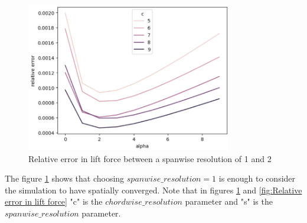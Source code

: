 \begin{figure}[H]
    \centering
    \includegraphics[width=0.8\textwidth]{figures/Optimization/3D/error_span_1_2.png}
    \caption{Relative error in lift force between a spanwise resolution of 1 and 2}
    \label{fig:Relative error in lift force between a spanwise resolution of 1 and 2}
\end{figure}

The figure \ref{fig:Relative error in lift force between a spanwise resolution of 1 and 2} shows that choosing $spanwise\_resolution = 1$ is enough to consider the simulation to have spatially converged. Note that in figures  \ref{fig:Relative error in lift force between a spanwise resolution of 1 and 2} and \ref{fig:Relative error in lift force} "c" is the $chordwise\_resolution$ parameter and "s" is the $spanwise\_resolution$ parameter.

